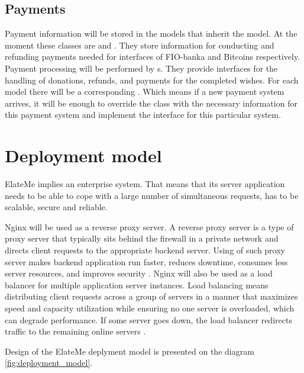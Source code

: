 \subsection{Payments}
Payment information will be stored in the models that inherit the  model. At the moment these classes are  and . They store information for conducting and refunding payments needed for interfaces of FIO-banka and Bitcoins respectively. Payment processing will be performed by s. They provide interfaces for the handling of donations, refunds, and payments for the completed wishes. For each  model there will be a corresponding . Which means if a new payment system arrives, it will be enough to override the  class with the necessary information for this payment system and implement the  interface for this particular system.




\section{Deployment model}
ElateMe implies an enterprise system. That means that its server application needs to be able to cope with a large number of simultaneous requests, has to be scalable, secure and reliable.

Nginx will be used as a reverse proxy server. A reverse proxy server is a type of proxy server that typically sits behind the firewall in a private network and directs client requests to the appropriate backend server. Using of such proxy server makes backend application run faster, reduces downtime, consumes less server resources, and improves security \cite{nginxdeploy}. Nginx will also be used as a load balancer for multiple application server instances. Load balancing means distributing client requests across a group of servers in a manner that maximizes speed and capacity utilization while ensuring no one server is overloaded, which can degrade performance. If some server goes down, the load balancer redirects traffic to the remaining online servers \cite{reverseproxy}.

Design of the ElateMe deplyment model is presented on the diagram \ref{fig:deployment_model}.

